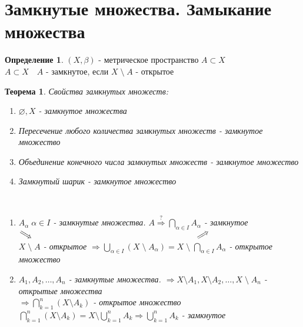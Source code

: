 \documentclass[12pt,letterpaper]{report}
\makeatletter
\newtheorem*{theorem-non}{Теорема}
\theoremstyle{definition}
\newtheorem*{conj}{Определение}
\renewenvironment{proof}[1][\proofname]{%
   \par\pushQED{\qed}\normalfont%
   \topsep6\p@\@plus6\p@\relax
   \trivlist\item[\hskip\labelsep\bfseries#1\@addpunct{.}]%
   \ignorespaces
}{%
   \popQED\endtrivlist\@endpefalse
}
\makeatother
\begin{document}
\section{Замкнутые множества. Замыкание множества}
\begin{conj}
    $(X, \beta)$ - метрическое пространство $A \subset X$ \\
    $A \subset X \quad A$ - замкнутое, если $X \; \setminus \; A$ -  открытое
\end{conj}
\begin{theorem-non}
    Свойства замкнутых множеств:
    \begin{enumerate}
        \item $\varnothing, X$ - замкнутое множества 
        \item Пересечение любого количества замкнутых множеств - замкнутое множество
        \item Объединение конечного числа замкнутых множеств - замкнутое множество
        \item Замкнутый шарик - замкнутое множество
    \end{enumerate}
    \begin{proof}
        \quad \\
        \begin{enumerate}
            \item[2.] $A_{\alpha} \; \alpha \in I$ - замкнутые множества. $A \overset{?}{\Longrightarrow} \bigcap\limits_{\alpha \in I} A_{\alpha}$ - замкнутое \\
            $\rotatebox[origin=c]{-30}{$\Longrightarrow$} \qquad \qquad \qquad \qquad \qquad \qquad \qquad \qquad \qquad \qquad \rotatebox[origin=c]{30}{$\Longrightarrow$}$ \vspace{0,2cm}\\
            $X \; \setminus \; A$ - открытое $\Longrightarrow \bigcup\limits_{\alpha \in I}(X \; \setminus \; A_{\alpha}) = X \; \setminus \; \bigcap\limits_{\alpha \in I} A_{\alpha}$ - открытое множество 
            \item[3.] $A_1, A_2, \dots , A_n$ - замкнутые множества. $\Longrightarrow X \setminus A_1, X \setminus A_2, \dots , X \; \setminus \; A_n$ - открытые множества \\ 
            $\Longrightarrow \bigcap\limits_{k = 1}^{n} (X \setminus A_k)$ - открытое множество \\
            $\bigcap\limits_{k = 1}^{n} (X \setminus A_k) = X \setminus \bigcup\limits_{k = 1}^{n} A_k \Longrightarrow \bigcup\limits_{k = 1}^{n} A_k$ - замкнутое

\end{enumerate}
\end{proof}
\end{theorem-non}
\end{document}
